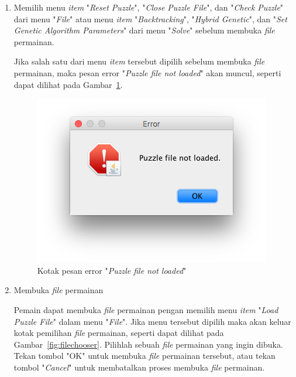 \begin{enumerate}
\item Memilih menu \textit{item} "\textit{Reset Puzzle}", "\textit{Close Puzzle File}", dan "\textit{Check Puzzle}" dari menu "\textit{File}" atau menu \textit{item} "\textit{Backtracking}", "\textit{Hybrid Genetic}", dan "\textit{Set Genetic Algorithm Parameters}" dari menu "\textit{Solve}" sebelum membuka \textit{file} permainan.

Jika salah satu dari menu \textit{item} tersebut dipilih sebelum membuka \textit{file} permainan, maka pesan error "\textit{Puzzle file not loaded}" akan muncul, seperti dapat dilihat pada Gambar~\ref{fig:puzzlefilenotloaded}.

\begin{figure}
\centering
\captionsetup{justification=centering}
\includegraphics[scale=0.5]{Gambar/ImplementasiPengujian/PuzzleFileNotLoaded.png}
\caption[Kotak pesan error "\textit{Puzzle file not loaded}"]{Kotak pesan error "\textit{Puzzle file not loaded}"}
\label{fig:puzzlefilenotloaded}
\end{figure}

\item Membuka \textit{file} permainan

Pemain dapat membuka \textit{file} permainan pengan memilih menu \textit{item} "\textit{Load Puzzle File}" dalam menu "\textit{File}". Jika menu tersebut dipilih maka akan keluar kotak pemilihan \textit{file} permainan, seperti dapat dilihat pada Gambar~\ref{fig:filechooser}. Pilihlah sebuah \textit{file} permainan yang ingin dibuka. Tekan tombol "OK" untuk membuka \textit{file} permainan tersebut, atau tekan tombol "\textit{Cancel}" untuk membatalkan proses membuka \textit{file} permainan.


\end{enumerate}

